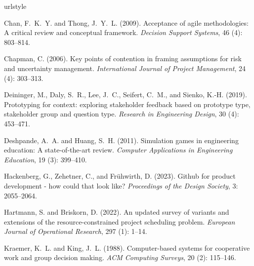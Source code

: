 \documentclass{PDS}
\begin{document}
\begin{Backmatter}

\begin{thebibliography}{21}
    
    \providecommand{\natexlab}[1]{#1} \providecommand{\url}[1]{\texttt{#1}} \expandafter\ifx\csname urlstyle\endcsname\relax \providecommand{\doi}[1]{doi: #1}\else \providecommand{\doi}{doi: \begingroup \urlstyle{rm}\Url}\fi

     Chan, F.~K.~Y. and Thong, J.~Y.~L. (2009). \newblock Acceptance of agile methodologies: A critical review and conceptual framework. \newblock \emph{Decision Support Systems}, 46 (4): 803--814.
    
     Chapman, C. (2006). \newblock Key points of contention in framing assumptions for risk and uncertainty management. \newblock \emph{International Journal of Project Management}, 24 (4): 303--313.
    
     Deininger, M., Daly, S.~R., Lee, J.~C., Seifert, C.~M., and Sienko, K.-H. (2019). \newblock Prototyping for context: exploring stakeholder feedback based on prototype type, stakeholder group and question type. \newblock \emph{Research in Engineering Design}, 30 (4): 453--471.
    
     Deshpande, A.~A. and Huang, S.~H. (2011). \newblock Simulation games in engineering education: A state-of-the-art review. \newblock \emph{Computer Applications in Engineering Education}, 19 (3): 399--410.
    
     Hackenberg, G., Zehetner, C., and Frühwirth, D. (2023). \newblock Github for product development - how could that look like? \newblock \emph{Proceedings of the Design Society}, 3: 2055–2064.
    
     Hartmann, S. and Briskorn, D. (2022). \newblock An updated survey of variants and extensions of the resource-constrained project scheduling problem. \newblock \emph{European Journal of Operational Research}, 297 (1): 1--14.
    
     Kraemer, K.~L. and King, J.~L. (1988). \newblock Computer-based systems for cooperative work and group decision making. \newblock \emph{ACM Computing Surveys}, 20 (2): 115–146.
    

\end{thebibliography}
\end{Backmatter}
\end{document}
